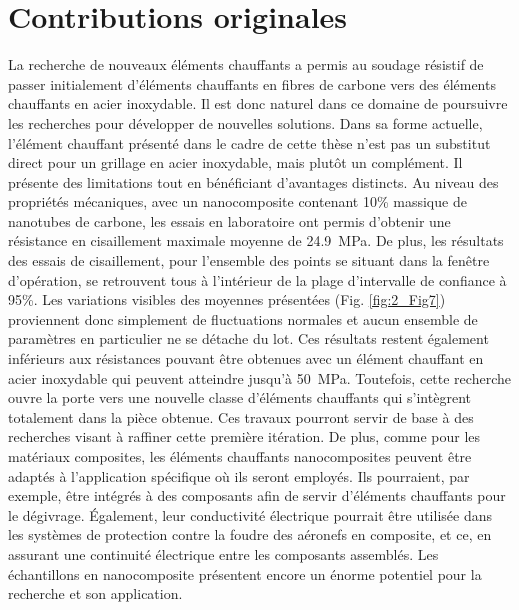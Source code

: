 \label{sec:Contributions}

\section{Contributions originales}

La recherche de nouveaux éléments chauffants a permis au soudage résistif de passer initialement d'éléments chauffants en fibres de carbone vers des éléments chauffants en acier inoxydable. 
Il est donc naturel dans ce domaine de poursuivre les recherches pour développer de nouvelles solutions. 
Dans sa forme actuelle, l'élément chauffant présenté dans le cadre de cette thèse n'est pas un substitut direct pour un grillage en acier inoxydable, mais plutôt un complément. 
Il présente des limitations tout en bénéficiant d'avantages distincts.
Au niveau des propriétés mécaniques, avec un nanocomposite contenant 10\% massique de nanotubes de carbone, les essais en laboratoire ont permis d'obtenir une résistance en cisaillement maximale moyenne de \SI{24.9}{\mega\pascal}. 
De plus, les résultats des essais de cisaillement, pour l'ensemble des points se situant dans la fenêtre d'opération, se retrouvent tous à l'intérieur de la plage d'intervalle de confiance à 95\%. 
Les variations visibles des moyennes présentées (Fig. \ref{fig:2_Fig7}) proviennent donc simplement de fluctuations normales et aucun ensemble de paramètres en particulier ne se détache du lot. 
Ces résultats restent également inférieurs aux résistances pouvant être obtenues avec un élément chauffant en acier inoxydable qui peuvent atteindre jusqu'à \SI{50}{\mega\pascal}. 
Toutefois, cette recherche ouvre la porte vers une nouvelle classe d'éléments chauffants qui s'intègrent totalement dans la pièce obtenue. 
Ces travaux pourront servir de base à des recherches visant à raffiner cette première itération. 
De plus, comme pour les matériaux composites, les éléments chauffants nanocomposites peuvent être adaptés à l'application spécifique où ils seront employés. 
Ils pourraient, par exemple, être intégrés à des composants afin de servir d'éléments chauffants pour le dégivrage. 
Également, leur conductivité électrique pourrait être utilisée dans les systèmes de protection contre la foudre des aéronefs en composite, et ce, en assurant une continuité électrique entre les composants assemblés. 
Les échantillons en nanocomposite présentent encore un énorme potentiel pour la recherche et son application. 

